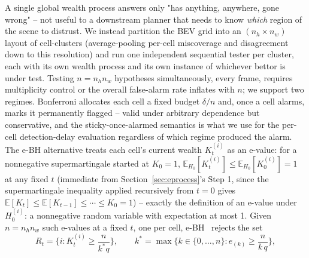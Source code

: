 A single global wealth process answers only "has anything, anywhere, gone wrong" -- not useful to a downstream planner that needs to know \emph{which} region of the scene to distrust. We instead partition the BEV grid into an $(n_h \times n_w)$ layout of cell-clusters (average-pooling per-cell miscoverage and disagreement down to this resolution) and run one independent sequential tester per cluster, each with its own wealth process and its own instance of whichever bettor is under test. Testing $n = n_h n_w$ hypotheses simultaneously, every frame, requires multiplicity control or the overall false-alarm rate inflates with $n$; we support two regimes. Bonferroni allocates each cell a fixed budget $\delta/n$ and, once a cell alarms, marks it permanently flagged -- valid under arbitrary dependence but conservative, and the sticky-once-alarmed semantics is what we use for the per-cell detection-delay evaluation regardless of which regime produced the alarm. The e-BH alternative treats each cell's current wealth $K_t^{(i)}$ as an e-value: for a nonnegative supermartingale started at $K_0=1$, $\mathbb{E}_{H_0}[K_t^{(i)}] \le \mathbb{E}_{H_0}[K_0^{(i)}] = 1$ at any fixed $t$ (immediate from Section~\ref{sec:eprocess}'s Step 1, since the supermartingale inequality applied recursively from $t=0$ gives $\mathbb{E}[K_t] \le \mathbb{E}[K_{t-1}] \le \cdots \le K_0 = 1$) -- exactly the definition of an e-value under $H_0^{(i)}$: a nonnegative random variable with expectation at most 1. Given $n = n_h n_w$ such e-values at a fixed $t$, one per cell, e-BH~\cite{WangRamdas2022JRSSB} rejects the set
\[
R_t = \Big\{ i : K_t^{(i)} \ge \frac{n}{k^\ast q} \Big\}, \qquad k^\ast = \max\Big\{ k \in \{0, \ldots, n\} : e_{(k)} \ge \frac{n}{k\,q} \Big\},
\]
